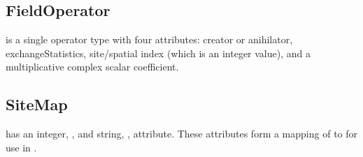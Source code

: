 
\subsection{\textbf{FieldOperator}}\label{subsec:FieldOperator}
 is a single operator type with four attributes: creator or anihilator, exchangeStatistics, site/spatial index (which is an integer value), and a multiplicative complex scalar coefficient.\\

\subsection{\textbf{SiteMap}}\label{subsec:Sitemap}
 has an integer, , and string, , attribute. These attributes form a mapping of  to  for use in \Clang.

